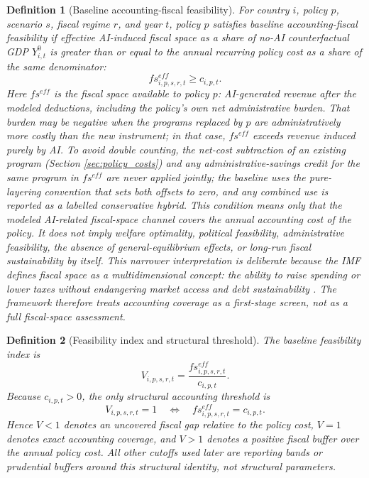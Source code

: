 \documentclass[11pt,a4paper]{article}
\newtheorem{definition}{Definition}
\begin{document}
\begin{definition}[Baseline accounting-fiscal feasibility]
For country $i$, policy $p$, scenario $s$, fiscal regime $r$, and year $t$, policy $p$ satisfies \emph{baseline accounting-fiscal feasibility} if effective AI-induced fiscal space as a share of no-AI counterfactual GDP $Y^0_{i,t}$ is greater than or equal to the annual recurring policy cost as a share of the same denominator:
\begin{equation}
    fs^{eff}_{i,p,s,r,t}\geq c_{i,p,t}.
\end{equation}
Here $fs^{eff}$ is the fiscal space available to policy $p$: AI-generated revenue after the modeled deductions, including the policy's own net administrative burden. That burden may be negative when the programs replaced by $p$ are administratively more costly than the new instrument; in that case, $fs^{eff}$ exceeds revenue induced purely by AI. To avoid double counting, the net-cost subtraction of an existing program (Section \ref{sec:policy_costs}) and any administrative-savings credit for the same program in $fs^{eff}$ are never applied jointly; the baseline uses the pure-layering convention that sets both offsets to zero, and any combined use is reported as a labelled conservative hybrid.
This condition means only that the modeled AI-related fiscal-space channel covers the annual accounting cost of the policy. It does not imply welfare optimality, political feasibility, administrative feasibility, the absence of general-equilibrium effects, or long-run fiscal sustainability by itself. This narrower interpretation is deliberate because the IMF defines fiscal space as a multidimensional concept: the ability to raise spending or lower taxes without endangering market access and debt sustainability \citep{imf2016fiscalspace}. The framework therefore treats accounting coverage as a first-stage screen, not as a full fiscal-space assessment.
\end{definition}

\begin{definition}[Feasibility index and structural threshold]
The baseline feasibility index is
\begin{equation}
    V_{i,p,s,r,t}=\frac{fs^{eff}_{i,p,s,r,t}}{c_{i,p,t}}.
\end{equation}
Because $c_{i,p,t}>0$, the only structural accounting threshold is
\begin{equation}
    V_{i,p,s,r,t}=1 \quad \Longleftrightarrow \quad fs^{eff}_{i,p,s,r,t}=c_{i,p,t}.
\end{equation}
Hence $V<1$ denotes an uncovered fiscal gap relative to the policy cost, $V=1$ denotes exact accounting coverage, and $V>1$ denotes a positive fiscal buffer over the annual policy cost. All other cutoffs used later are reporting bands or prudential buffers around this structural identity, not structural parameters.
\end{definition}
\end{document}
